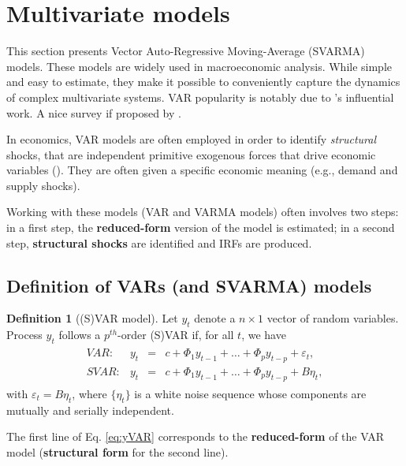 \documentclass[
  12pt,
]{book}
\theoremstyle{definition}
\newtheorem{definition}{Definition}[chapter]
\theoremstyle{definition}
\theoremstyle{definition}
\theoremstyle{definition}
\theoremstyle{remark}
\begin{document}
\hypertarget{VAR}{%
\section{Multivariate models}\label{VAR}}

This section presents Vector Auto-Regressive Moving-Average (SVARMA) models. These models are widely used in macroeconomic analysis. While simple and easy to estimate, they make it possible to conveniently capture the dynamics of complex multivariate systems. VAR popularity is notably due to \citet{Sims_1980}'s influential work. A nice survey if proposed by \citet{Stock_Watson_2016}.

In economics, VAR models are often employed in order to identify \emph{structural} shocks, that are independent primitive exogenous forces that drive economic variables (\citet{Ramey_2016_NBER}). They are often given a specific economic meaning (e.g., demand and supply shocks).

Working with these models (VAR and VARMA models) often involves two steps: in a first step, the \textbf{reduced-form} version of the model is estimated; in a second step, \textbf{structural shocks} are identified and IRFs are produced.

\hypertarget{definition-of-vars-and-svarma-models}{%
\subsection{Definition of VARs (and SVARMA) models}\label{definition-of-vars-and-svarma-models}}

\begin{definition}[(S)VAR model]
\protect\hypertarget{def:SVAR}{}\label{def:SVAR}Let \(y_{t}\) denote a \(n \times1\) vector of random variables. Process \(y_{t}\) follows a \(p^{th}\)-order (S)VAR if, for all \(t\), we have
\begin{eqnarray}
\begin{array}{rllll}
VAR:& y_t &=& c + \Phi_1 y_{t-1} + \dots + \Phi_p y_{t-p} + \varepsilon_t,\\
SVAR:& y_t &=& c + \Phi_1 y_{t-1} + \dots + \Phi_p y_{t-p} + B \eta_t,
\end{array}\label{eq:yVAR}
\end{eqnarray}
with \(\varepsilon_t = B\eta_t\), where \(\{\eta_{t}\}\) is a white noise sequence whose components are mutually and serially independent.
\end{definition}

The first line of Eq. \eqref{eq:yVAR} corresponds to the \textbf{reduced-form} of the VAR model (\textbf{structural form} for the second line).
\end{document}
